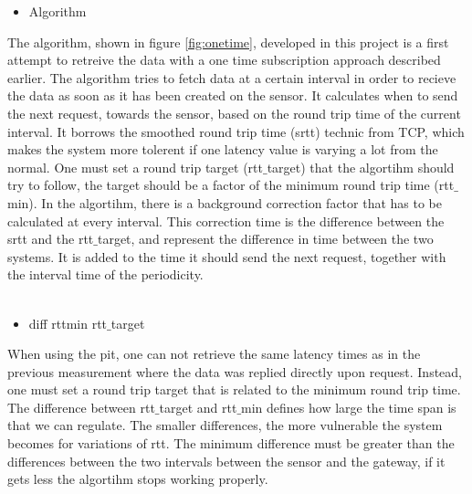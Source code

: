 \begin{itemize}
\item Algorithm
\end{itemize}
The algorithm, shown in figure \ref{fig:onetime}, developed in this project is a first attempt to retreive the data with a one time subscription approach described earlier. 
The algorithm tries to fetch data at a certain interval in order to recieve the data as soon as it has been created on the sensor. It calculates when to send the next request, towards the sensor, based on the round trip time of the current interval. It borrows the smoothed round trip time (srtt) technic from TCP, which makes the system more tolerent if one latency value is varying a lot from the normal. One must set a round trip target (rtt$\_$target) that the algortihm should try to follow, the target should be a factor of the minimum round trip time (rtt$\_$min). In the algortihm, there is a background correction factor that has to be calculated at every interval. This correction time is the difference between the srtt and the rtt$\_$target, and represent the difference in time between the two systems. It is added to the time it should send the next request, together with the interval time of the periodicity.\\\\
\begin{itemize}
\item diff rttmin rtt$\_$target
\end{itemize}
When using the pit, one can not retrieve the same latency times as in the previous measurement where the data was replied directly upon request. Instead, one must set a round trip target that is related to the minimum round trip time. The difference between rtt$\_$target and rtt$\_$min defines how large the time span is that we can regulate. The smaller differences, the more vulnerable the system becomes for variations of rtt. The minimum difference must be greater than the differences between the two intervals between the sensor and the gateway, if it gets less the algortihm stops working properly.

